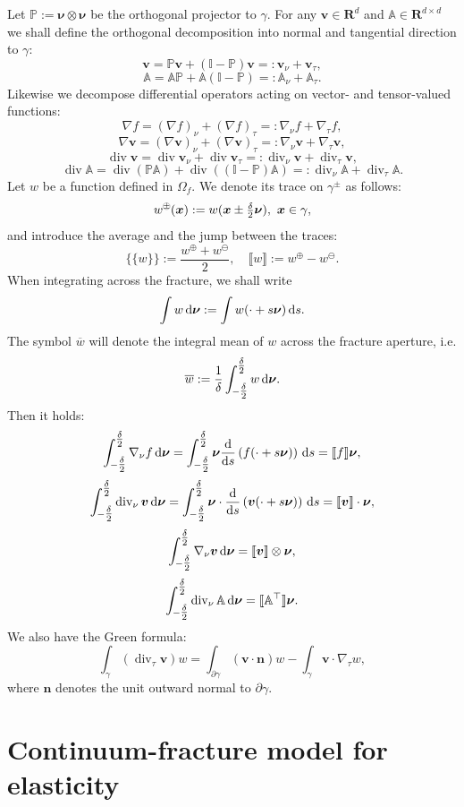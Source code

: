 \documentclass[a4paper]{article}
\def\avg#1{\{\!\{#1\}\!\}}
\def\d {\,{\rm d}}
\def\div{\operatorname{div}}
\def\dn{\d\nnu}
\def\jmp#1{\llbracket #1 \rrbracket}
\def\nn{\vc n}
\def\nnu{\vc\nu}
\def\prtl{\partial}
\def\Real{{\mathbf R}}
\def\tn#1{{\mathbb{#1}}}    %
\def\vc#1{\mathbf{\boldsymbol{#1}}}     %
\def\vv{\vc v}
\def\xx{\vc x}
\newcommand{\eq}[1]{\begin{equation}#1\end{equation}}
\newcommand{\opm}{ %
  {\mathbin{
    \mathchoice
      {\buildcirclepm{\displaystyle     }{0.14ex}{0.95}{0.05ex}{.7}}
      {\buildcirclepm{\textstyle        }{0.14ex}{0.95}{0.05ex}{.7}}
      {\buildcirclepm{\scriptstyle      }{0.13ex}{0.955}{0.04ex}{.55}}
      {\buildcirclepm{\scriptscriptstyle}{0.08ex}{0.95}{0.03ex}{.45}}
  }} 
}
\newcommand\buildcirclepm[5]{%
  \begin{tikzpicture}[baseline=(X.base), inner sep=-#5, outer sep=-.65]
    \node[draw,circle,line width=#4] (X)  {\footnotesize\raisebox{#2}{\scalebox{#3}{$#1\pm$}}};
  \end{tikzpicture}%
}
\begin{document}
Let $\tn P := \nnu\otimes\nnu$ be the orthogonal projector to $\gamma$.
For any $\vv\in\Real^d$ and $\tn A\in\Real^{d\times d}$ we shall define the orthogonal decomposition into normal and tangential direction to $\gamma$:
\eq{ \vv = \tn P\vv + (\tn I-\tn P)\vv =:\vv_\nu + \vv_\tau, }
\eq{ \tn A = \tn A\tn P + \tn A(\tn I-\tn P) =: \tn A_\nu + \tn A_\tau. }
Likewise we decompose differential operators acting on vector- and tensor-valued functions:
\eq{ \label{eq:grad_sc} \nabla f = (\nabla f)_\nu + (\nabla f)_\tau =: \nabla_\nu f + \nabla_\tau f, }
\eq{ \label{eq:grad_vc} \nabla\vv = (\nabla\vv)_\nu + (\nabla\vv)_\tau =: \nabla_\nu\vv + \nabla_\tau\vv, }
\eq{ \div\vv = \div\vv_\nu + \div\vv_\tau =: \div_\nu\vv + \div_\tau\vv, }
\eq{ \label{eq:div_tn} \div\tn A = \div(\tn P\tn A) + \div((\tn I-\tn P)\tn A) =: \div_\nu\tn A + \div_\tau\tn A. }
Let $w$ be a function defined in $\Omega_f$.
We denote its trace on $\gamma^\pm$ as follows:
\eq{ w^{\opm}(\xx) := w(\xx\pm\tfrac\delta2\nnu), ~\xx\in\gamma, }
and introduce the average and the jump between the traces:
\eq{ \avg{w} := \frac{w^\oplus+w^\ominus}2,\quad \jmp{w} := w^\oplus-w^\ominus. }
When integrating across the fracture, we shall write
\[ \int w\dn := \int w(\cdot+s\nnu)\d s. \]
The symbol $\overline w$ will denote the integral mean of $w$ across the fracture aperture, i.e.
\eq{\label{eq:def_mean} \overline w:=\frac1\delta\int_{-\tfrac\delta2}^{\tfrac\delta2} w \dn. }
Then it holds:
\eq{ \label{eq:int_grad_nu_sc}
\int_{-\tfrac\delta2}^{\tfrac\delta2}\nabla_\nu f\dn = \int_{-\tfrac\delta2}^{\tfrac\delta2}\nnu\frac{\rm d}{{\rm d}s}\left(f(\cdot+s\nnu)\right)\d s = \jmp{f}\nnu,
}
\eq{ \label{eq:div_nu_vc}
\int_{-\tfrac\delta2}^{\tfrac\delta2}\div_\nu\vv\dn = \int_{-\tfrac\delta2}^{\tfrac\delta2}\nnu\cdot\frac{\rm d}{{\rm d}s}\left(\vv(\cdot+s\nnu)\right)\d s = \jmp{\vv}\cdot\nnu,
}
\eq{ \label{eq:int_grad_nu_vc} \int_{-\tfrac\delta2}^{\tfrac\delta2}\nabla_\nu\vv\dn = \jmp{\vv}\otimes\nnu, }
\eq{ \label{eq:int_div_nu_tn} \int_{-\tfrac\delta2}^{\tfrac\delta2}\div_\nu\tn A \dn = \jmp{\tn A^\top}\nnu. }
We also have the Green formula:
\eq{ \int_\gamma(\div_\tau\vv)w = \int_{\prtl\gamma}(\vv\cdot\nn)w - \int_\gamma\vv\cdot\nabla_\tau w, }
where $\nn$ denotes the unit outward normal to $\partial\gamma$.



\section{Continuum-fracture model for elasticity}
\end{document}
